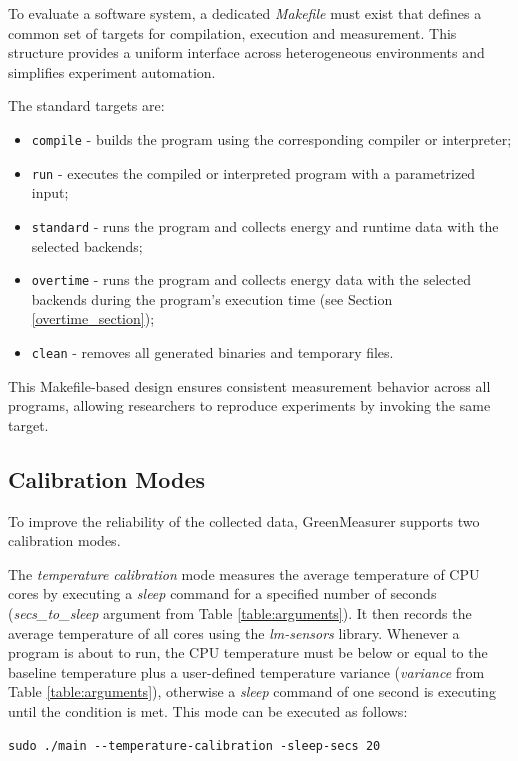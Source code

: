 To evaluate a software system, a dedicated \textit{Makefile} must exist that defines a common set of targets for compilation, execution and measurement. This structure provides a uniform interface across heterogeneous environments and simplifies experiment automation.

The standard targets are:
\begin{itemize}
    \item \texttt{compile} - builds the program using the corresponding compiler or interpreter;
    \item \texttt{run} - executes the compiled or interpreted program with a parametrized input;
    \item \texttt{standard} - runs the program and collects energy and runtime data with the selected backends;
    \item \texttt{overtime} - runs the program and collects energy data with the selected backends during the program's execution time (see Section \ref{overtime_section});
    \item \texttt{clean} - removes all generated binaries and temporary files.
\end{itemize}

This Makefile-based design ensures consistent measurement behavior across all programs, allowing researchers to reproduce experiments by invoking the same target. 

\subsection{Calibration Modes}
\label{calibration_modes_section}

To improve the reliability of the collected data, GreenMeasurer supports two calibration modes.

The \textit{temperature calibration} mode measures the average temperature of CPU cores by executing a \textit{sleep} command for a specified number of seconds (\textit{secs\_to\_sleep} argument from Table \ref{table:arguments}). It then records the average temperature of all cores using the \textit{lm-sensors} library. Whenever a program is about to run, the CPU temperature must be below or equal to the baseline temperature plus a user-defined temperature variance (\textit{variance} from Table \ref{table:arguments}), otherwise a \textit{sleep} command of one second is executing until the condition is met. This mode can be executed as follows:

\begin{verbatim}
sudo ./main --temperature-calibration -sleep-secs 20
\end{verbatim}

